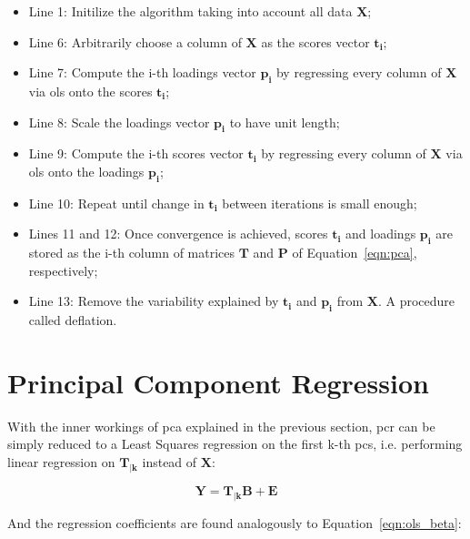 \begin{itemize}
	\item Line 1: Initilize the algorithm taking into account all data $\mathbf{X}$;
	
	\item Line 6: Arbitrarily choose a column of $\mathbf{X}$ as the scores vector $\mathbf{t_i}$;
	
	\item Line 7: Compute the i-th loadings vector $\mathbf{p_i}$ by regressing every column of $\mathbf{X}$ via \acrshort{ols} onto the scores $\mathbf{t_i}$;
	
	\item Line 8: Scale the loadings vector $\mathbf{p_i}$ to have unit length;
	
	\item Line 9: Compute the i-th scores vector $\mathbf{t_i}$ by regressing every column of $\mathbf{X}$ via \acrshort{ols} onto the loadings $\mathbf{p_i}$;
	
	\item Line 10: Repeat until change in $\mathbf{t_i}$ between iterations is small enough;
	
	\item Lines 11 and 12: Once convergence is achieved, scores $\mathbf{t_i}$ and loadings $\mathbf{p_i}$ are stored as the i-th column of matrices $\mathbf{T}$ and $\mathbf{P}$ of Equation~\ref{eqn:pca}, respectively;
	
	\item Line 13: Remove the variability explained by $\mathbf{t_i}$ and $\mathbf{p_i}$ from $\mathbf{X}$. A procedure called deflation.
\end{itemize}

\section{Principal Component Regression}
\label{sec:pcr}

With the inner workings of \acrshort{pca} explained in the previous section, \acrshort{pcr} can be simply reduced to a Least Squares regression on the first k-th \acrshort{pc}s, i.e. performing linear regression on $\mathbf{T_{|k}}$ instead of $\mathbf{X}$:
	
	\begin{equation}
		\label{eqn:pcr}
		\mathbf{Y = T_{|k} B + E}
	\end{equation}

And the regression coefficients are found analogously to Equation~\ref{eqn:ols_beta}:

